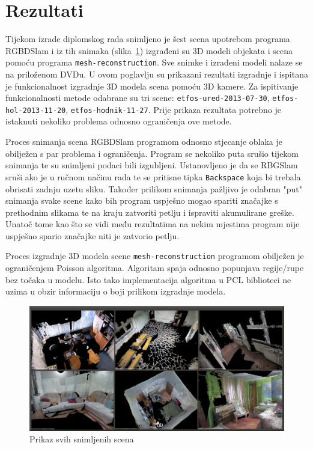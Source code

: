\newpage
\setcounter{figure}{0}

\section{Rezultati} %
\label{sec:Rezultati}

Tijekom izrade diplomskog rada snimljeno je šest scena upotrebom
programa RGBDSlam i iz tih snimaka (slika~\ref{fig:01-all.png}) 
izgrađeni su 3D modeli objekata i scena pomoću programa
\texttt{mesh-reconstruction}. Sve snimke i izrađeni modeli nalaze se na
priloženom DVDu. U ovom poglavlju su prikazani rezultati izgradnje i
ispitana je funkcionalnost izgradnje 3D modela scena pomoću 3D kamere.
Za ispitivanje funkcionalnosti metode odabrane su tri scene:
\texttt{etfos-ured-2013-07-30}, \texttt{etfos-hol-2013-11-20},
\texttt{etfos-hodnik-11-27}. Prije prikaza rezultata potrebno je
istaknuti nekoliko problema odnosno ograničenja ove metode.

Proces snimanja scena RGBDSlam programom odnosno stjecanje oblaka je
obilježen s par problema i ograničenja. Program se nekoliko puta srušio
tijekom snimanja te su snimljeni podaci bili izgubljeni. Ustanovljeno je
da se RBGSlam sruši ako je u ručnom načinu rada te se pritisne tipka
\texttt{Backspace} koja bi trebala obrisati zadnju uzetu sliku. Također
prilikom snimanja pažljivo je odabran "put" snimanja svake scene kako
bih program uspješno mogao spariti značajke s prethodnim slikama te na
kraju zatvoriti petlju i ispraviti akumulirane greške. Unatoč tome kao
što se vidi među rezultatima na nekim mjestima program nije uspješno
spario značajke niti je zatvorio petlju.

Proces izgradnje 3D modela scene \texttt{mesh-reconstruction} programom
obilježen je ograničenjem Poisson algoritma. Algoritam spaja odnosno
popunjava regije/rupe bez točaka u modelu. Isto tako implementacija
algoritma u PCL biblioteci ne uzima u obzir informaciju o boji prilikom
izgradnje modela.

\begin{figure}[h]
\centering
\includegraphics[scale=0.20]{figures/01-all-pcd.png}
\caption{Prikaz svih snimljenih scena}
\label{fig:01-all.png}
\end{figure}

